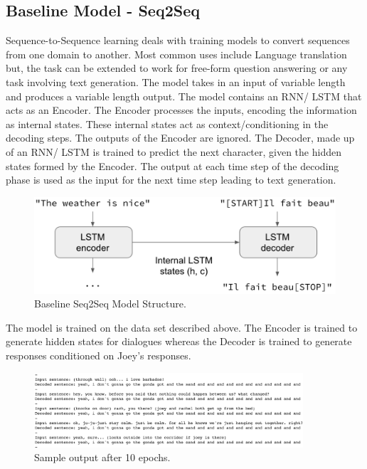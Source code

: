 \documentclass{article}
\begin{document}
\subsection*{Baseline Model - Seq2Seq}
Sequence-to-Sequence learning deals with training models to convert sequences from one domain to another. Most common uses include Language translation but, the task can be extended to work for free-form question answering or any task involving text generation.
The model takes in an input of variable length and produces a variable length output. The model contains an RNN/ LSTM that acts as an Encoder. The Encoder processes the inputs, encoding the information as internal states. These internal states act as context/conditioning in the decoding steps. The outputs of the Encoder are ignored. The Decoder, made up of an RNN/ LSTM is trained to predict the next character, given the hidden states formed by the Encoder. The output at each time step of the decoding phase is used as the input for the next time step leading to text generation.
\begin{figure}[h]
  \centering
  \includegraphics[width=120mm]{seq2seq.PNG}
  \caption{Baseline Seq2Seq Model Structure.}
\end{figure}

The model is trained on the data set described above.
The Encoder is trained to generate hidden states for dialogues whereas the Decoder is trained to generate responses conditioned on Joey's responses.
\begin{figure}[h]
  \centering
  \includegraphics[width=100mm]{initOutput.PNG}
  \caption{Sample output after 10 epochs.}
\end{figure}
\end{document}
